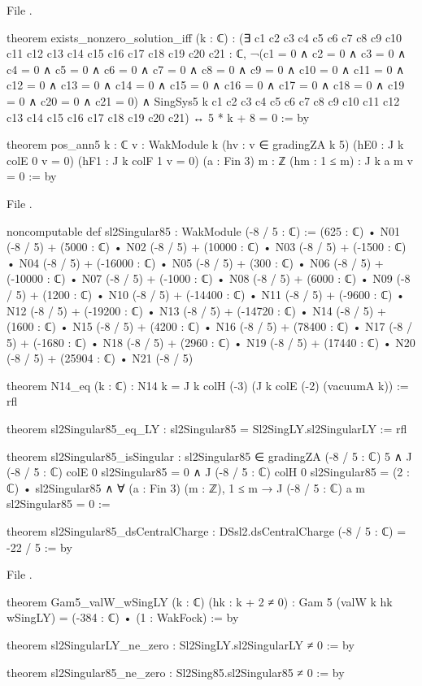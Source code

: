 \noindent File .
\begin{leancode}
theorem exists_nonzero_solution_iff (k : ℂ) :
    (∃ c1 c2 c3 c4 c5 c6 c7 c8 c9 c10 c11 c12 c13 c14 c15 c16 c17 c18 c19 c20 c21 : ℂ,
        ¬(c1 = 0 ∧ c2 = 0 ∧ c3 = 0 ∧ c4 = 0 ∧ c5 = 0 ∧ c6 = 0 ∧ c7 = 0 ∧ c8 = 0 ∧ c9 = 0
            ∧ c10 = 0 ∧ c11 = 0 ∧ c12 = 0 ∧ c13 = 0 ∧ c14 = 0 ∧ c15 = 0 ∧ c16 = 0 ∧ c17 = 0
            ∧ c18 = 0 ∧ c19 = 0 ∧ c20 = 0 ∧ c21 = 0)
          ∧ SingSys5 k c1 c2 c3 c4 c5 c6 c7 c8 c9 c10 c11 c12 c13 c14 c15 c16 c17 c18 c19
              c20 c21) ↔ 5 * k + 8 = 0 := by

theorem pos_ann5 {k : ℂ} {v : WakModule k} (hv : v ∈ gradingZA k 5)
    (hE0 : J k colE 0 v = 0) (hF1 : J k colF 1 v = 0)
    (a : Fin 3) {m : ℤ} (hm : 1 ≤ m) : J k a m v = 0 := by
\end{leancode}
\noindent File .
\begin{leancode}
noncomputable def sl2Singular85 : WakModule (-8 / 5 : ℂ) :=
  (625 : ℂ) • N01 (-8 / 5) + (5000 : ℂ) • N02 (-8 / 5) + (10000 : ℂ) • N03 (-8 / 5)
    + (-1500 : ℂ) • N04 (-8 / 5) + (-16000 : ℂ) • N05 (-8 / 5) + (300 : ℂ) • N06 (-8 / 5)
    + (-10000 : ℂ) • N07 (-8 / 5) + (-1000 : ℂ) • N08 (-8 / 5) + (6000 : ℂ) • N09 (-8 / 5)
    + (1200 : ℂ) • N10 (-8 / 5) + (-14400 : ℂ) • N11 (-8 / 5) + (-9600 : ℂ) • N12 (-8 / 5)
    + (-19200 : ℂ) • N13 (-8 / 5) + (-14720 : ℂ) • N14 (-8 / 5) + (1600 : ℂ) • N15 (-8 / 5)
    + (4200 : ℂ) • N16 (-8 / 5) + (78400 : ℂ) • N17 (-8 / 5) + (-1680 : ℂ) • N18 (-8 / 5)
    + (2960 : ℂ) • N19 (-8 / 5) + (17440 : ℂ) • N20 (-8 / 5) + (25904 : ℂ) • N21 (-8 / 5)

theorem N14_eq (k : ℂ) : N14 k = J k colH (-3) (J k colE (-2) (vacuumA k)) := rfl

theorem sl2Singular85_eq_LY : sl2Singular85 = Sl2SingLY.sl2SingularLY := rfl

theorem sl2Singular85_isSingular :
    sl2Singular85 ∈ gradingZA (-8 / 5 : ℂ) 5
      ∧ J (-8 / 5 : ℂ) colE 0 sl2Singular85 = 0
      ∧ J (-8 / 5 : ℂ) colH 0 sl2Singular85 = (2 : ℂ) • sl2Singular85
      ∧ ∀ (a : Fin 3) (m : ℤ), 1 ≤ m → J (-8 / 5 : ℂ) a m sl2Singular85 = 0 :=

theorem sl2Singular85_dsCentralCharge :
    DSsl2.dsCentralCharge (-8 / 5 : ℂ) = -22 / 5 := by
\end{leancode}
\noindent File .
\begin{leancode}
theorem Gam5_valW_wSingLY (k : ℂ) (hk : k + 2 ≠ 0) :
    Gam 5 (valW k hk wSingLY) = (-384 : ℂ) • (1 : WakFock) := by

theorem sl2SingularLY_ne_zero : Sl2SingLY.sl2SingularLY ≠ 0 := by

theorem sl2Singular85_ne_zero : Sl2Sing85.sl2Singular85 ≠ 0 := by
\end{leancode}

